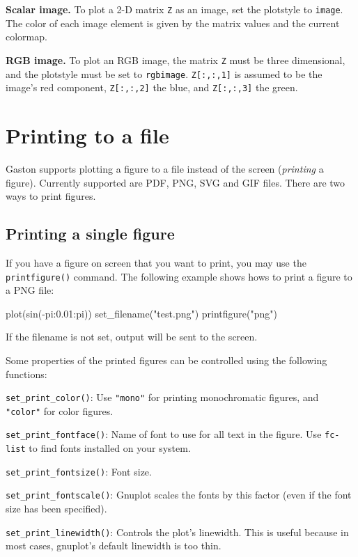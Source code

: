 \documentclass[11pt]{article}
\newcommand{\cmd}[1]{\texttt{#1}}
\begin{document}
\textbf{Scalar image.} To plot a 2-D matrix \cmd{Z} as an image, set the
plotstyle to \cmd{image}. The color of each image element is given by the
matrix values and the current colormap.

\textbf{RGB image.} To plot an RGB image, the matrix \cmd{Z} must be three
dimensional, and the plotstyle must be set to \cmd{rgbimage}.  \cmd{Z[:,:,1]}
is assumed to be the image's red component, \cmd{Z[:,:,2]} the blue, and
\cmd{Z[:,:,3]} the green.

\section{Printing to a file}
\label{s:print}

Gaston supports plotting a figure to a file instead of the screen
(\textit{printing} a figure). Currently supported are PDF, PNG,  SVG and GIF
files. There are two ways to print figures.

\subsection{Printing a single figure}

If you have a figure on screen that you want to print, you may use the
\cmd{printfigure()} command. The following example shows hows to print a figure
to a PNG file:

\begin{juliacode}
plot(sin(-pi:0.01:pi))
set_filename("test.png")
printfigure("png")
\end{juliacode}

If the filename is not set, output will be sent to the screen.

Some properties of the printed figures can be controlled using the following
functions:

\cmd{set\_print\_color()}: Use \cmd{"mono"} for printing monochromatic figures,
and \cmd{"color"} for color figures.

\cmd{set\_print\_fontface()}: Name of font to use for all text in the figure. Use
\cmd{fc-list} to find fonts installed on your system.

\cmd{set\_print\_fontsize()}: Font size.

\cmd{set\_print\_fontscale()}: Gnuplot scales the fonts by this factor (even
if the font size has been specified).

\cmd{set\_print\_linewidth()}: Controls the plot's linewidth. This is useful
because in most cases, gnuplot's default linewidth is too thin.
\end{document}
